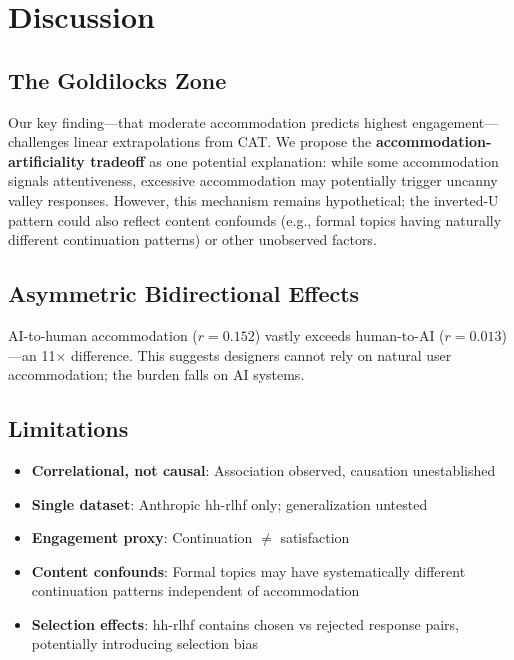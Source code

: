 \section{Discussion}

\subsection{The Goldilocks Zone}

Our key finding---that moderate accommodation predicts highest engagement---challenges linear extrapolations from CAT. We propose the \textbf{accommodation-artificiality tradeoff} as one potential explanation: while some accommodation signals attentiveness, excessive accommodation may potentially trigger uncanny valley responses. However, this mechanism remains hypothetical; the inverted-U pattern could also reflect content confounds (e.g., formal topics having naturally different continuation patterns) or other unobserved factors.

\subsection{Asymmetric Bidirectional Effects}

AI-to-human accommodation ($r=0.152$) vastly exceeds human-to-AI ($r=0.013$)---an 11$\times$ difference. This suggests designers cannot rely on natural user accommodation; the burden falls on AI systems.

\subsection{Limitations}

\begin{itemize}
    \item \textbf{Correlational, not causal}: Association observed, causation unestablished
    \item \textbf{Single dataset}: Anthropic hh-rlhf only; generalization untested
    \item \textbf{Engagement proxy}: Continuation $\neq$ satisfaction
    \item \textbf{Content confounds}: Formal topics may have systematically different continuation patterns independent of accommodation
    \item \textbf{Selection effects}: hh-rlhf contains chosen vs rejected response pairs, potentially introducing selection bias
\end{itemize}
